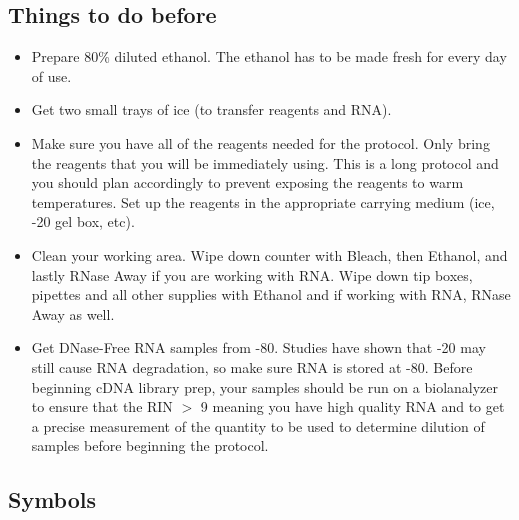 \documentclass[11pt, oneside]{article}
\begin{document}
		\vspace{3mm}
		
	\subsection{Things to do before}
	
		\begin{itemize}
			\itemsep0em
			\item Prepare 80\% diluted ethanol. The ethanol has to be made fresh for every day of use. 
			\item Get two small trays of ice (to transfer reagents and RNA). 
			\item Make sure you have all of the reagents needed for the protocol. Only bring the reagents that you will be immediately using. This is a 			long protocol and you should plan accordingly to prevent exposing the reagents to warm temperatures. Set up the reagents in the appropriate 			carrying medium (ice, -20 gel box, etc).
			\item Clean your working area. Wipe down counter with Bleach, then Ethanol, and lastly RNase Away if you are working with RNA. Wipe 				down tip boxes, pipettes and all other supplies with Ethanol and if working with RNA, RNase Away as well. 
			\item Get DNase-Free RNA samples from -80. Studies have shown that -20 may still cause RNA degradation, so make sure RNA is stored at 			-80. Before beginning cDNA library prep, your samples should be run on a biolanalyzer to ensure that the RIN $>$ 9 meaning you have high 			quality RNA and to get a precise measurement of the quantity to be used to determine dilution of samples before beginning the protocol. 
		\end{itemize}
		
	\subsection{Symbols}
	
		\vspace{4mm}
	
		\newcommand{\vcenteredinclude}[1]{\begingroup
		\setbox0=\hbox{\texttt{[image: \#1]}}
		\parbox{\wd0}{\box0}\endgroup}
	
\end{document}
